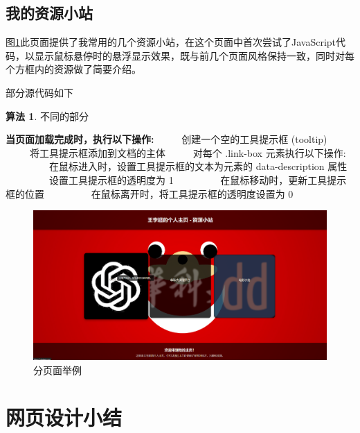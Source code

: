 \documentclass[supercite]{Experimental_Report}
\theoremstyle{definition}
\newtheorem{alg}{算法}[section]
\begin{document}
\subsection{我的资源小站}

图\ref{fig3-5}此页面提供了我常用的几个资源小站，在这个页面中首次尝试了JavaScript代码，以显示鼠标悬停时的悬浮显示效果，既与前几个页面风格保持一致，同时对每个方框内的资源做了简要介绍。

部分源代码如下

\begin{shaded*}
	\begin{alg}{不同的部分}
		\label{alg:1}
		\begin{algorithmic}
			\State \textbf{当页面加载完成时，执行以下操作:}
			\State \ \ \ \ \ 创建一个空的工具提示框 (tooltip)
			\State \ \ \ \ \ 将工具提示框添加到文档的主体
			\State \ \ \ \ \ 对每个 .link-box 元素执行以下操作:
			\State \ \ \ \ \ \ \ \ \ 在鼠标进入时，设置工具提示框的文本为元素的 data-description 属性
			\State \ \ \ \ \ \ \ \ \ 设置工具提示框的透明度为 1
			\State \ \ \ \ \ \ \ \ \ 在鼠标移动时，更新工具提示框的位置
			\State \ \ \ \ \ \ \ \ \ 在鼠标离开时，将工具提示框的透明度设置为 0
		\end{algorithmic}
	\end{alg}
\end{shaded*}



\begin{figure}[htb]
	\begin{center}
		\includegraphics[scale=0.25]{images/3-5.png}
		\caption{分页面举例}
		\label{fig3-5}
	\end{center}
\end{figure}

\newpage

\section{网页设计小结}
\end{document}
